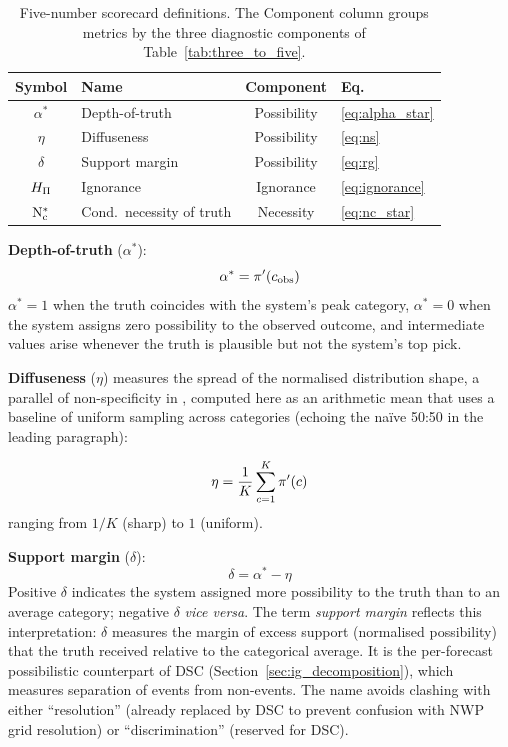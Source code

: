 \begin{table}[htbp]
\centering
\caption{Five-number scorecard definitions. The Component column
    groups metrics by the three diagnostic components of
    Table~\ref{tab:three_to_five}.}
\label{tab:scorecard_defs}
\small
\begin{tabular}{clcl}
\toprule
Symbol & Name & Component & Eq.\ \\
\midrule
$\alpha^*$ & Depth-of-truth & Possibility
    & \eqref{eq:alpha_star} \\
$\eta$ & Diffuseness & Possibility
    & \eqref{eq:ns} \\
$\delta$ & Support margin & Possibility
    & \eqref{eq:rg} \\
$H_{\Pi}$ & Ignorance & Ignorance
    & \eqref{eq:ignorance} \\
$\mathrm{N}_{\mathrm{c}}^*$ & Cond.\ necessity of truth & Necessity
    & \eqref{eq:nc_star} \\
\bottomrule
\end{tabular}
\end{table}

\textbf{Depth-of-truth} ($\alpha^*$):
\begin{equation}
\alpha^* = \pi'(c_{\mathrm{obs}}) \label{eq:alpha_star}
\end{equation}
$\alpha^* = 1$ when the truth coincides with the
system's peak category, $\alpha^* = 0$ when the
system assigns zero possibility to the observed
outcome, and intermediate values arise whenever
the truth is
plausible but not the system's top pick.

\textbf{Diffuseness} ($\eta$) measures the spread of
the normalised distribution shape,
a parallel of non-specificity in \citet{Klir1995-va},
computed here as an arithmetic mean that uses a
baseline of uniform sampling across categories
(echoing the na\"ive 50:50 in the leading paragraph):

\begin{equation}
\eta = \frac{1}{K} \sum_{c=1}^{K} \pi'(c) \label{eq:ns}
\end{equation}
ranging from $1/K$ (sharp) to $1$ (uniform).

\textbf{Support margin} ($\delta$):
\begin{equation}
\delta = \alpha^* - \eta \label{eq:rg}
\end{equation}
Positive $\delta$ indicates the system assigned more
possibility to the truth than to an average category;
negative $\delta$ \textit{vice versa}.
The term \textit{support margin} reflects this
interpretation: $\delta$ measures the margin of excess
support (normalised possibility) that the truth
received relative to the categorical average.
It is the per-forecast possibilistic counterpart of
DSC (Section~\ref{sec:ig_decomposition}),
which measures separation of events from non-events.
The name avoids clashing with either ``resolution''
(already replaced by DSC to prevent confusion with
NWP grid resolution) or ``discrimination''
(reserved for DSC).

